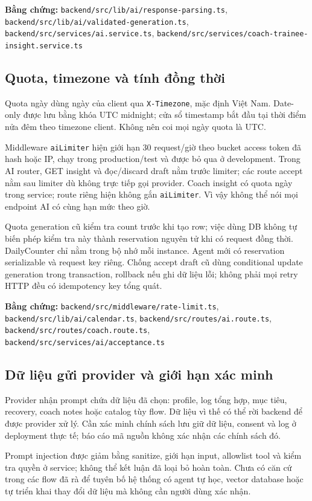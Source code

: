 \documentclass[12pt,a4paper]{article}
\newcommand{\code}[1]{\texttt{#1}}
\newcommand{\evidence}[1]{{\small\nolinkurl{#1}}}
\begin{document}
\textbf{Bằng chứng:} \evidence{backend/src/lib/ai/response-parsing.ts}, \evidence{backend/src/lib/ai/validated-generation.ts}, \evidence{backend/src/services/ai.service.ts}, \evidence{backend/src/services/coach-trainee-insight.service.ts}

\subsection{Quota, timezone và tính đồng thời}
Quota ngày dùng ngày của client qua \code{X-Timezone}, mặc định Việt Nam. Date-only được lưu bằng khóa UTC midnight; cửa sổ timestamp bắt đầu tại thời điểm nửa đêm theo timezone client. Không nên coi mọi ngày quota là UTC.

Middleware \code{aiLimiter} hiện giới hạn 30 request/giờ theo bucket access token đã hash hoặc IP, chạy trong production/test và được bỏ qua ở development. Trong AI router, GET insight và đọc/discard draft nằm trước limiter; các route accept nằm sau limiter dù không trực tiếp gọi provider. Coach insight có quota ngày trong service; route riêng hiện không gắn \code{aiLimiter}. Vì vậy không thể nói mọi endpoint AI có cùng hạn mức theo giờ.

Quota generation cũ kiểm tra count trước khi tạo row; việc dùng DB không tự biến phép kiểm tra này thành reservation nguyên tử khi có request đồng thời. DailyCounter chỉ nằm trong bộ nhớ mỗi instance. Agent mới có reservation serializable và request key riêng. Chống accept draft cũ dùng conditional update generation trong transaction, rollback nếu ghi dữ liệu lỗi; không phải mọi retry HTTP đều có idempotency key tổng quát.

\textbf{Bằng chứng:} \evidence{backend/src/middleware/rate-limit.ts}, \evidence{backend/src/lib/ai/calendar.ts}, \evidence{backend/src/routes/ai.route.ts}, \evidence{backend/src/routes/coach.route.ts}, \evidence{backend/src/services/ai/acceptance.ts}

\subsection{Dữ liệu gửi provider và giới hạn xác minh}
Provider nhận prompt chứa dữ liệu đã chọn: profile, log tổng hợp, mục tiêu, recovery, coach notes hoặc catalog tùy flow. Dữ liệu vì thế có thể rời backend để được provider xử lý. Cần xác minh chính sách lưu giữ dữ liệu, consent và log ở deployment thực tế; báo cáo mã nguồn không xác nhận các chính sách đó.

Prompt injection được giảm bằng sanitize, giới hạn input, allowlist tool và kiểm tra quyền ở service; không thể kết luận đã loại bỏ hoàn toàn. Chưa có căn cứ trong các flow đã rà để tuyên bố hệ thống có agent tự học, vector database hoặc tự triển khai thay đổi dữ liệu mà không cần người dùng xác nhận.
\end{document}
